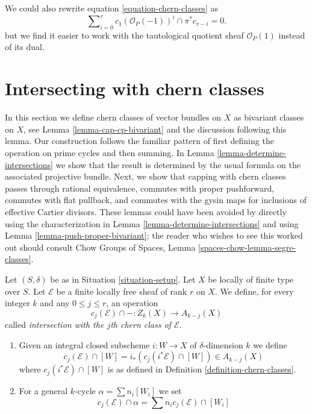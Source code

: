 \begin{remark}
\label{remark-equation-signs}
We could also rewrite equation \ref{equation-chern-classes} as
\begin{equation}
\label{equation-signs}
\sum\nolimits_{i = 0}^r
c_1(\mathcal{O}_P(-1))^i \cap \pi^*c_{r - i}
= 0.
\end{equation}
but we find it easier to work with the tautological quotient
sheaf $\mathcal{O}_P(1)$ instead of
its dual.
\end{remark}




\section{Intersecting with chern classes}
\label{section-intersecting-chern-classes}

\noindent
In this section we define chern classes of vector bundles on $X$ as
bivariant classes on $X$, see Lemma \ref{lemma-cap-cp-bivariant}
and the discussion following this lemma. Our construction follows the familiar
pattern of first defining the operation on prime cycles and then
summing. In Lemma \ref{lemma-determine-intersections} we show
that the result is determined by the usual formula on the associated
projective bundle. Next, we show that capping with chern classes
passes through rational equivalence, commutes with proper pushforward,
commutes with flat pullback, and commutes with the gysin maps for
inclusions of effective Cartier divisors. These lemmas could have been
avoided by directly using the characterization in
Lemma \ref{lemma-determine-intersections} and using
Lemma \ref{lemma-push-proper-bivariant}; the reader who wishes to
see this worked out should consult
Chow Groups of Spaces, Lemma \ref{spaces-chow-lemma-segre-classes}.

\begin{definition}
\label{definition-cap-chern-classes}
Let $(S, \delta)$ be as in Situation \ref{situation-setup}.
Let $X$ be locally of finite type over $S$.
Let $\mathcal{E}$ be a finite locally free sheaf of rank $r$ on $X$.
We define, for every integer $k$ and any $0 \leq j \leq r$,
an operation
$$
c_j(\mathcal{E}) \cap - : Z_k(X) \to A_{k - j}(X)
$$
called {\it intersection with the $j$th chern class of $\mathcal{E}$}.
\begin{enumerate}
\item Given an integral closed subscheme $i : W \to X$ of $\delta$-dimension
$k$ we define
$$
c_j(\mathcal{E}) \cap [W] = i_*(c_j({i^*\mathcal{E}}) \cap [W])
\in
A_{k - j}(X)
$$
where $c_j({i^*\mathcal{E}}) \cap [W]$ is as defined in
Definition \ref{definition-chern-classes}.
\item For a general $k$-cycle $\alpha = \sum n_i [W_i]$ we set
$$
c_j(\mathcal{E}) \cap \alpha = \sum n_i c_j(\mathcal{E}) \cap [W_i]
$$
\end{enumerate}
\end{definition}

